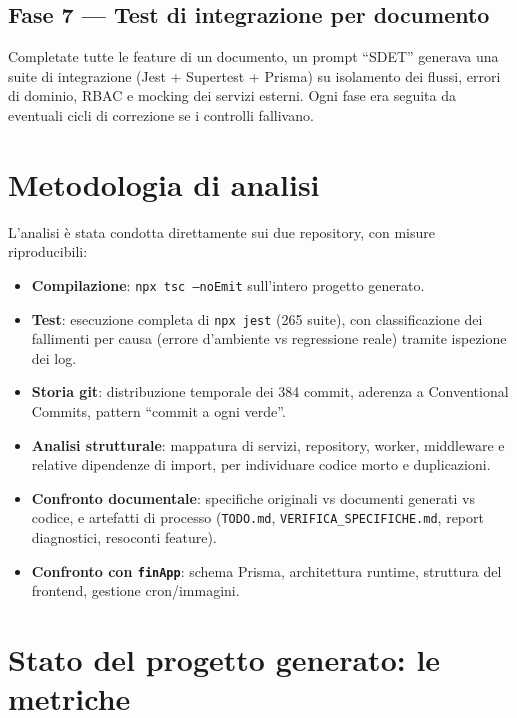 \documentclass[11pt,a4paper]{article}
\newcommand{\file}[1]{\texttt{\small #1}}
\begin{document}
\subsection{Fase 7 --- Test di integrazione per documento}
Completate tutte le feature di un documento, un prompt ``SDET'' generava una suite di integrazione (Jest + Supertest + Prisma) su isolamento dei flussi, errori di dominio, RBAC e mocking dei servizi esterni. Ogni fase era seguita da eventuali cicli di correzione se i controlli fallivano.

\section{Metodologia di analisi}

L'analisi \`e stata condotta direttamente sui due repository, con misure riproducibili:

\begin{itemize}[leftmargin=1.5em]
  \item \textbf{Compilazione}: \file{npx tsc --noEmit} sull'intero progetto generato.
  \item \textbf{Test}: esecuzione completa di \file{npx jest} (265 suite), con classificazione dei fallimenti per causa (errore d'ambiente vs regressione reale) tramite ispezione dei log.
  \item \textbf{Storia git}: distribuzione temporale dei 384 commit, aderenza a Conventional Commits, pattern ``commit a ogni verde''.
  \item \textbf{Analisi strutturale}: mappatura di servizi, repository, worker, middleware e relative dipendenze di import, per individuare codice morto e duplicazioni.
  \item \textbf{Confronto documentale}: specifiche originali vs documenti generati vs codice, e artefatti di processo (\file{TODO.md}, \file{VERIFICA\_SPECIFICHE.md}, report diagnostici, resoconti feature).
  \item \textbf{Confronto con \file{finApp}}: schema Prisma, architettura runtime, struttura del frontend, gestione cron/immagini.
\end{itemize}

\section{Stato del progetto generato: le metriche}
\end{document}
